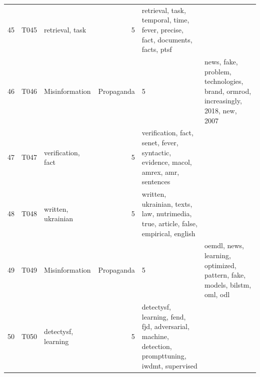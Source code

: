 \begin{tabular}{rllrl}
45 & T045 & retrieval, task & 5 & retrieval, task, temporal, time, fever, precise, fact, documents, facts, ptsf \\
46 & T046 & Misinformation & Propaganda & 5 & news, fake, problem, technologies, brand, ormrod, increasingly, 2018, new, 2007 \\
47 & T047 & verification, fact & 5 & verification, fact, senet, fever, syntactic, evidence, macol, amrex, amr, sentences \\
48 & T048 & written, ukrainian & 5 & written, ukrainian, texts, law, nutrimedia, true, article, false, empirical, english \\
49 & T049 & Misinformation & Propaganda & 5 & oemdl, news, learning, optimized, pattern, fake, models, bilstm, oml, odl \\
50 & T050 & detectysf, learning & 5 & detectysf, learning, fend, fjd, adversarial, machine, detection, prompttuning, iwdmt, supervised \\
\bottomrule
\end{tabular}
